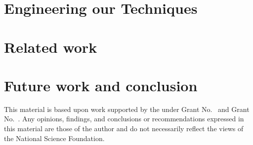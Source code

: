 \documentclass[acmsmall,review,anonymous]{acmart}\settopmatter{printfolios=true,printccs=false,printacmref=false}
\begin{document}
\section{Engineering our Techniques}
\label{sec:development}


\section{Related work}
\label{sec:related}


\section{Future work and conclusion}
\label{sec:future}
\label{sec:conclusion}


\begin{acks}                            %
  This material is based upon work supported by the
   under Grant
  No.~ and Grant
  No.~.  Any opinions, findings, and
  conclusions or recommendations expressed in this material are those
  of the author and do not necessarily reflect the views of the
  National Science Foundation.
\end{acks}





\end{document}
